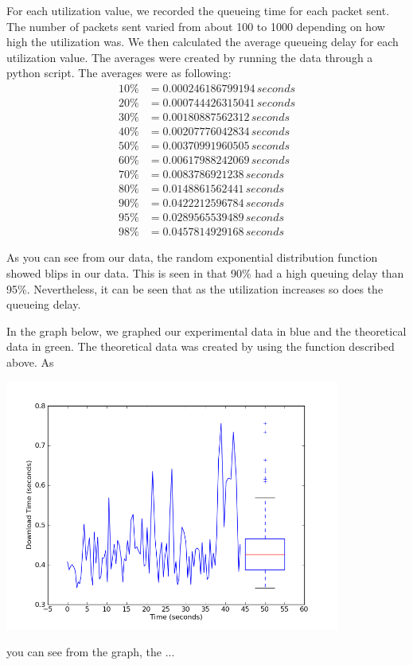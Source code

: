 \documentclass[fleqn,11pt]{article}
\begin{document}
For each utilization value, we recorded the queueing time for each packet sent. The number of packets sent varied from about 100 to 1000 depending on how high the utilization was. We then calculated the average queueing delay for each utilization value. The averages were created by running the data through a python script. The averages were as following:
\begin{align*}
10\%&=0.000246186799194\,seconds\\
20\%&=0.000744426315041\,seconds\\
30\%&=0.00180887562312\,seconds\\
40\%&=0.00207776042834\,seconds\\
50\%&=0.00370991960505\,seconds\\
60\%&=0.00617988242069\,seconds\\
70\%&=0.0083786921238\,seconds\\
80\%&=0.0148861562441\,seconds\\
90\%&=0.0422212596784\,seconds\\
95\%&=0.0289565539489\,seconds\\
98\%&=0.0457814929168\,seconds
\end{align*}

As you can see from our data, the random exponential distribution function showed blips in our data. This is seen in that 90\% had a high queuing delay than 95\%. Nevertheless, it can be seen that as the utilization increases so does the queueing delay.

In the graph below, we graphed our experimental data in blue and the theoretical data in green. The theoretical data was created by using the function described above. As 

\includegraphics[width=11cm]{graphs/download-combined}

you can see from the graph, the ...
\end{document}
